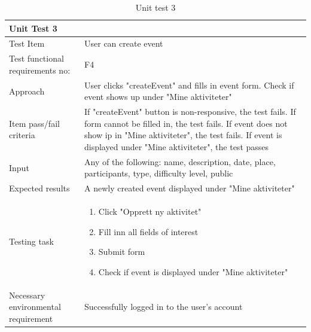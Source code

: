 \begin{table}[H]
\begin{tabular}{ | L{0.25\linewidth} | L{0.75\linewidth} | } 
 \hline {}
 Unit Test 3 &  \\
 \hline
 Test Item & User can create event \\ 
 \hline
 Test functional requirements no: & F4
 \\
 \hline
 Approach & User clicks "createEvent" and fills in event form. Check if event shows up under "Mine aktiviteter" \\ 
  \hline
 Item pass/fail criteria &  If "createEvent" button is non-responsive, the test fails. If form cannot be filled in, the test fails. If event does not show ip in "Mine aktiviteter", the test fails. If event is displayed under "Mine aktiviteter", the test passes  \\ 
 \hline
 Input &  Any of the following: name, description, date, place, participants, type, difficulty level, public\\ 
 \hline
 Expected results & A newly created event displayed under "Mine aktiviteter" \\ 
  \hline
Testing task &
\vspace{-5mm}
    \begin{enumerate}[noitemsep]
  \item Click "Opprett ny aktivitet"
  \item Fill inn all fields of interest
  \item Submit form
  \item Check if event is displayed under "Mine aktiviteter"
   \end{enumerate}\\
 \hline
 Necessary environmental requirement & Successfully logged in to the user's account \\ 
 \hline
\end{tabular}
\caption{Unit test 3}
\end{table}

